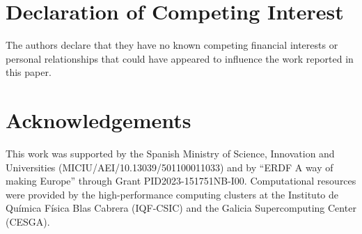 \documentclass[final,5p,times,twocolumn]{elsarticle}
\begin{document}
\section*{Declaration of Competing Interest}
The authors declare that they have no known competing financial
interests or personal relationships that could have appeared to
influence the work reported in this paper. 

\section*{Acknowledgements}
\enlargethispage{2\baselineskip}
This work was supported by the Spanish Ministry of Science, Innovation
and Universities (MICIU/AEI/10.13039/501100011033) and by ``ERDF A way
of making Europe'' through Grant PID2023-151751NB-I00. Computational
resources were provided by the high-performance computing clusters at
the Instituto de Qu{\'{i}}mica F{\'{i}}sica Blas Cabrera (IQF-CSIC)
and the Galicia Supercomputing Center (CESGA).  






\end{document}
